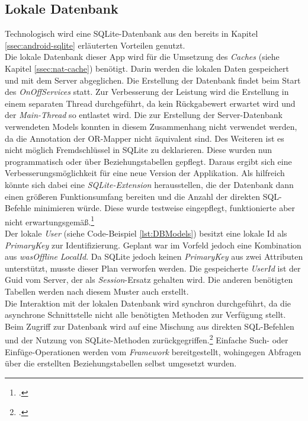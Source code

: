 \subsection{Lokale Datenbank}
\label{ssec:nat-db}
Technologisch wird eine SQLite-Datenbank aus den bereits in Kapitel \ref{ssec:android-sqlite} erläuterten Vorteilen genutzt.\\
Die lokale Datenbank dieser App wird für die Umsetzung des \textit{Caches} (siehe Kapitel \ref{ssec:nat-cache}) benötigt. Darin werden die lokalen Daten gespeichert und mit dem Server abgeglichen.
Die Erstellung der Datenbank findet beim Start des \textit{OnOffServices} statt. Zur Verbesserung der Leistung wird die Erstellung in einem separaten Thread durchgeführt, da kein Rückgabewert erwartet wird und der \textit{Main-Thread} so entlastet wird. Die zur Erstellung der Server-Datenbank verwendeten Models konnten in diesem Zusammenhang nicht verwendet werden, da die Annotation der OR-Mapper nicht äquivalent sind. Des Weiteren ist es nicht möglich Fremdschlüssel in SQLite zu deklarieren. Diese wurden nun programmatisch oder über Beziehungstabellen gepflegt. Daraus ergibt sich eine Verbesserungsmöglichkeit für eine neue Version der Applikation. Als hilfreich könnte sich dabei eine \textit{SQLite-Extension} herausstellen, die der Datenbank dann einen größeren Funktionsumfang bereiten und die Anzahl der direkten SQL-Befehle minimieren würde. Diese wurde testweise eingepflegt, funktionierte aber nicht erwartungsgemäß.\footcite{Android-SQLiteExtension}\\

Der lokale \textit{User} (siehe Code-Beispiel \ref{lst:DBModels}) besitzt eine lokale Id als \textit{PrimaryKey} zur Identifizierung. Geplant war im Vorfeld jedoch eine Kombination aus \textit{wasOffline} \textit{LocalId}. Da SQLite jedoch keinen \textit{PrimaryKey} aus zwei Attributen unterstützt, musste dieser Plan verworfen werden. Die gespeicherte \textit{UserId} ist der Guid vom Server, der als \textit{Session}-Ersatz gehalten wird. Die anderen benötigten Tabellen werden nach diesem Muster auch erstellt.\\
Die Interaktion mit der lokalen Datenbank wird synchron durchgeführt, da die asynchrone Schnittstelle nicht alle benötigten Methoden zur Verfügung stellt. Beim Zugriff zur Datenbank wird auf eine Mischung aus direkten SQL-Befehlen und der Nutzung von SQLite-Methoden zurückgegriffen.\footcite[Vgl.]{Android-SQLiteORM} Einfache Such- oder Einfüge-Operationen werden vom \textit{Framework} bereitgestellt, wohingegen Abfragen über die erstellten Beziehungstabellen selbst umgesetzt wurden.
